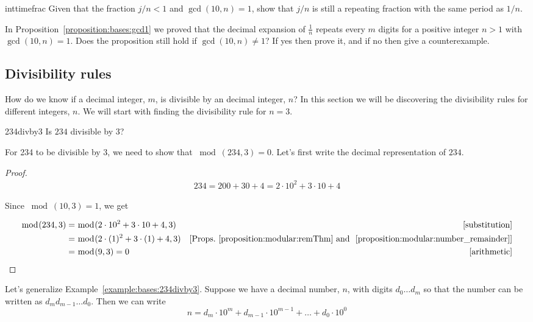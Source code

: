 \begin{exercise}{inttimefrac}
 Given that the fraction $j/n < 1$ and $\gcd(10,n)=1$, show that $j/n$  is still a repeating fraction with the same period as $1/n$.
\end{exercise}

\begin{exercise}{}
In Proposition~\ref{proposition:bases:gcd1} we proved that the decimal expansion of $\frac{1}{n}$ repeats every $m$ digits for a positive integer $n>1$ with 
$\gcd(10,n)=1$. Does the proposition still hold if $\gcd(10,n)\neq 1$? If yes then prove it, and  if no then give a counterexample.
\end{exercise}
\subsection{Divisibility rules}

How do we know if a decimal integer, $m$, is divisible by an decimal integer, $n$? In this section we will be discovering the divisibility rules for different integers, $n$. We will start with finding the divisibility rule for $n=3$.

\begin{example}{234divby3}
Is $234$ divisible by $3$?
\end{example}
For 234 to be divisible by 3, we need to show that $\bmod(234,3)=0$. Let's first write the decimal representation of $234$. 
 
\begin{proof}

\begin{align*}
234=200+30+4=2\cdot 10^{2}+3\cdot 10+4
\end{align*}

Since $\bmod(10,3)=1$, we get 

\begin{align*}
\bmod(234,3)&=\bmod(2 \cdot 10^{2}+3 \cdot 10+4,3) & [\textrm{substitution}]\\
&=\bmod(2\cdot(1)^2+3\cdot(1)+4,3) & [\textrm{Props.~\ref{proposition:modular:remThm} and ~\ref{proposition:modular:number_remainder}}]\\
&=\bmod(9,3)=0 & [\textrm{arithmetic}]
\end{align*}

\end{proof}

Let's generalize Example~\ref{example:bases:234divby3}. Suppose we have a decimal number, $n$, with digits $d_{0}\dots d_{m}$  so that the number can be written as $d_{m}d_{m-1}\dots d_{0}$. Then we can write 
\begin{equation}
n=d_{m}\cdot 10^{m}+d_{m-1}\cdot 10^{m-1}+\dots +d_{0}\cdot 10^{0}
\end{equation}

